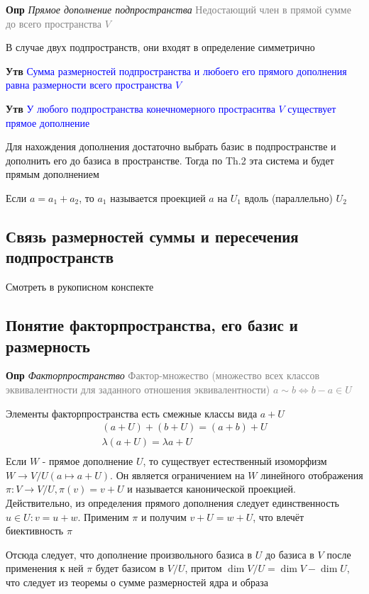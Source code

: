 \textbf{Опр} \textit{Прямое дополнение подпространства} \textcolor{gray}{Недостающий член в прямой сумме до всего
пространства $V$}

В случае двух подпространств, они входят в определение симметрично

\textbf{Утв} \textcolor{blue}{Сумма размерностей подпространства и любоего его прямого дополнения равна
размерности всего пространства $V$}

\textbf{Утв} \textcolor{blue}{У любого подпространства конечномерного простраснтва $V$ существует прямое дополнение}

Для нахождения дополнения достаточно выбрать базис в подпространстве и дополнить его до базиса в пространстве.
Тогда по Th.2 эта система и будет прямым дополнением

Если $a = a_1 + a_2$, то $a_1$ называется проекцией $a$ на $U_1$ вдоль (параллельно) $U_2$

\subsection{Связь размерностей суммы и пересечения подпространств}

Смотреть в рукописном конспекте

\subsection{Понятие факторпространства, его базис и размерность}

\textbf{Опр} \textit{Факторпространство} \textcolor{gray}{Фактор-множество (множество всех классов
эквивалентности для заданного отношения эквивалентности) $a \sim b \Leftrightarrow b - a \in U$}

Элементы факторпространства есть смежные классы вида $a + U$
\begin{gather*}
    (a + U) + (b + U) = (a + b) + U\\
    \lambda (a + U) = \lambda a + U\\
\end{gather*}
Если $W$ - прямое дополнение $U$, то существует естественный изоморфизм $W \rightarrow V/U (a \mapsto a + U)$.
Он является ограничением на $W$ линейного отображения $\pi: V \rightarrow V/U, \pi (v) = v + U$ и называется
канонической проекцией.
Действительно, из определения прямого дополнения следует единственность $u \in U: v = u + w$.
Применим $\pi$ и получим $v + U = w + U$, что влечёт биективность $\pi$

Отсюда следует, что дополнение произвольного базиса в $U$ до базиса в $V$ после применения к ней $\pi$ будет
базисом в $V/U$, притом $\dim V/U = \dim V - \dim U$, что следует из теоремы о сумме размерностей ядра и образа